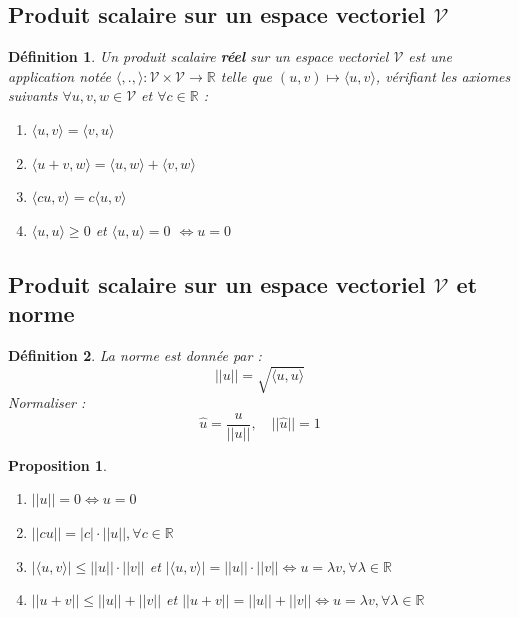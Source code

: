 \documentclass{article}[french, babel]
\newtheorem{mydef}{Définition}
\newtheorem{myprop}{Proposition}
\begin{document}
	\subsection{Produit scalaire sur un espace vectoriel $\mathcal{V}$}  
		\begin{mydef}
			Un produit scalaire \textbf{réel} sur un espace vectoriel $\mathcal{V}$ est une application notée $\langle ,., \rangle : \mathcal{V}\times \mathcal{V} \longrightarrow\mathbb{R}$ telle que $(u,v)\longmapsto \langle u,v \rangle$, vérifiant les axiomes suivants $\forall u,v,w\in \mathcal{V}$ et $ \forall c\in\mathbb{R}$  :
			\begin{enumerate}
				\item $\langle u,v \rangle = \langle v,u \rangle$
				\item $\langle u+v, w \rangle=\langle u,w \rangle +\langle v, w \rangle$
				\item $\langle cu,v \rangle=c\langle u,v \rangle$
				\item $\langle u,u \rangle\geq 0$ et $\langle u,u \rangle=0$ $\Longleftrightarrow u=0$
			\end{enumerate}
		\end{mydef}
	\subsection{Produit scalaire sur un espace vectoriel  $\mathcal{V}$ et norme}
		\begin{mydef}
			La norme est donnée par :
			\[||u||=\sqrt{\langle u,u\rangle}\]
			Normaliser :
			\[\hat{u}=\frac{u}{||u||},\quad||\hat{u}||=1\]
		\end{mydef}
		\begin{myprop}
			 ~
			\begin{enumerate}
				\item $||u||= 0 \Longleftrightarrow u=0$
				\item $||cu|| =|c|\cdot||u||,\forall c\in\mathbb{R}$
				\item $|\langle u,v \rangle|\leq ||u||\cdot||v||$ et $|\langle u,v \rangle|= ||u||\cdot||v||\Longleftrightarrow u=\lambda v,\forall \lambda\in\mathbb{R}$
				\item $||u+v||\leq||u||+||v||$ et $||u+v||=||u||+||v||\Longleftrightarrow u=\lambda v,\forall \lambda\in\mathbb{R}$
			\end{enumerate}
		\end{myprop}
\end{document}

